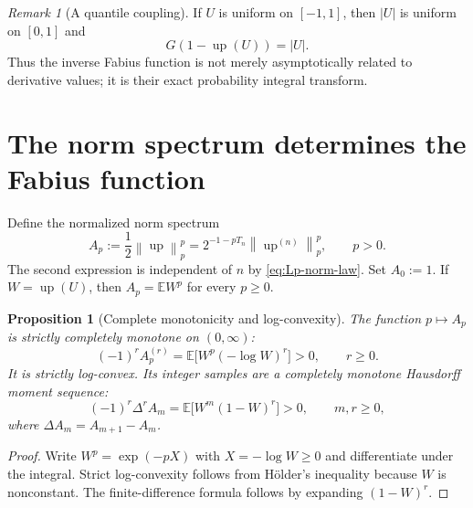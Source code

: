 \documentclass[11pt,oneside]{article}
\numberwithin{equation}{section}
\theoremstyle{plain}
\newtheorem{proposition}[theorem]{Proposition}
\theoremstyle{definition}
\theoremstyle{remark}
\newtheorem{remark}[theorem]{Remark}
\newcommand{\Up}{\operatorname{up}}
\newcommand{\E}{\mathbb E}
\newcommand{\norm}[1]{\left\lVert#1\right\rVert}
\begin{document}
\begin{remark}[A quantile coupling]
If $U$ is uniform on $[-1,1]$, then $|U|$ is uniform on $[0,1]$ and
\begin{equation}
 G\!\left(1-\Up(U)\right)=|U|.
 \label{eq:quantile-coupling}
\end{equation}
Thus the inverse Fabius function is not merely asymptotically related to derivative values;
it is their exact probability integral transform.
\end{remark}

\section{The norm spectrum determines the Fabius function}
\label{sec:hausdorff}

Define the normalized norm spectrum
\begin{equation}
 A_p:=\frac12\norm{\Up}_p^p
 =2^{-1-pT_n}\norm{\Up^{(n)}}_p^p,
 \qquad p>0.
 \label{eq:Ap-definition}
\end{equation}
The second expression is independent of $n$ by \eqref{eq:Lp-norm-law}.
Set $A_0:=1$.  If $W=\Up(U)$, then $A_p=\E W^p$ for every $p\geq0$.

\begin{proposition}[Complete monotonicity and log-convexity]
\label{prop:complete-monotonicity}
The function $p\mapsto A_p$ is strictly completely monotone on $(0,\infty)$:
\begin{equation}
 (-1)^rA_p^{(r)}
 =\E\bigl[W^p(-\log W)^r\bigr]>0,
 \qquad r\geq0.
 \label{eq:continuous-complete-monotonicity}
\end{equation}
It is strictly log-convex.  Its integer samples are a completely monotone Hausdorff moment
sequence:
\begin{equation}
 (-1)^r\Delta^r A_m
 =\E\bigl[W^m(1-W)^r\bigr]>0,
 \qquad m,r\geq0,
 \label{eq:discrete-complete-monotonicity}
\end{equation}
where $\Delta A_m=A_{m+1}-A_m$.
\end{proposition}

\begin{proof}
Write $W^p=\exp(-pX)$ with $X=-\log W\geq0$ and differentiate under the integral.
Strict log-convexity follows from H\"older's inequality because $W$ is nonconstant.
The finite-difference formula follows by expanding $(1-W)^r$.
\end{proof}
\end{document}
